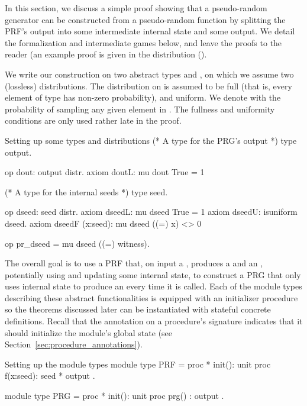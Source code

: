 
In this section, we discuss a simple proof showing that a pseudo-random
generator can be constructed from a pseudo-random function by splitting the
PRF's output into some intermediate internal state and some output. We detail
the formalization and intermediate games below, and leave the \pRHL proofs to
the reader (an example proof is given in the \EasyCrypt distribution
().

We write our construction on two abstract types  and , on
which we assume two (lossless) distributions. The distribution on  is
assumed to be full (that is, every element of type  has non-zero
probability), and uniform. We denote with  the probability of
sampling any given element in . The fullness and uniformity conditions
are only used rather late in the proof.

\begin{easycrypt}[style=easycrypt-pretty]{Setting up some types and distributions}
(* A type for the PRG's output *)
type output.

op dout: output distr.
axiom doutL: mu dout True = 1%

(* A type for the internal seeds *)
type seed.

op dseed: seed distr.
axiom dseedL: mu dseed True = 1%
axiom dseedU: isuniform dseed.
axiom dseedF (x:seed): mu dseed ((=) x) <> 0%

op pr_dseed = mu dseed ((=) witness).
\end{easycrypt}

The overall goal is to use a PRF that, on input a , produces a
 and an , potentially using and updating some internal
state, to construct a PRG that only uses internal state to produce an
 every time it is called. Each of the module types describing these
abstract functionalities is equipped with an initializer procedure  so
the theorems discussed later can be instantiated with stateful concrete
definitions. Recall that the \ec{*} annotation on a procedure's signature
indicates that it should initialize the module's global state
(see Section~\ref{sec:procedure_annotations}).

\begin{easycrypt}[style=easycrypt-pretty]{Setting up the module types}
module type PRF = {
  proc * init(): unit
  proc f(x:seed): seed * output
}.

module type PRG = {
  proc * init(): unit
  proc prg() : output
}.
\end{easycrypt}


